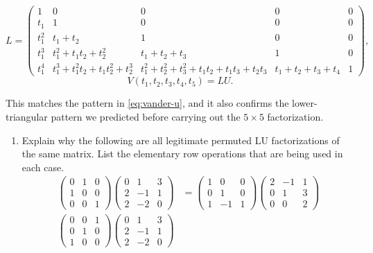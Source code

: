 \documentclass[10pt]{extarticle}
\begin{document}
\[
L=
\begin{pmatrix}
1 & 0 & 0 & 0 & 0\\
t_1 & 1 & 0 & 0 & 0\\
t_1^2 & t_1+t_2 & 1 & 0 & 0\\
t_1^3 & t_1^2+t_1t_2+t_2^2 & t_1+t_2+t_3 & 1 & 0\\
t_1^4 & t_1^3+t_1^2t_2+t_1t_2^2+t_2^3 & t_1^2+t_2^2+t_3^2+t_1t_2+t_1t_3+t_2t_3 & t_1+t_2+t_3+t_4 & 1
\end{pmatrix},
\]
\[
V(t_1,t_2,t_3,t_4,t_5)=LU.
\]
\endgroup

This matches the pattern in \eqref{eq:vander-u}, and it also confirms the lower-triangular pattern we predicted before carrying out the $5\times5$ factorization.

\newpage

\begin{problem}[Problem 3]
\begin{enumerate}[label=(\alph*)]
\item Explain why the following are all legitimate permuted LU factorizations of the same matrix. List the elementary row operations that are being used in each case.
\begin{align*}
\begin{pmatrix}
0 & 1 & 0\\
1 & 0 & 0\\
0 & 0 & 1
\end{pmatrix}
\begin{pmatrix}
0 & 1 & 3\\
2 & -1 & 1\\
2 & -2 & 0
\end{pmatrix}
&=
\begin{pmatrix}
1 & 0 & 0\\
0 & 1 & 0\\
1 & -1 & 1
\end{pmatrix}
\begin{pmatrix}
2 & -1 & 1\\
0 & 1 & 3\\
0 & 0 & 2
\end{pmatrix}\\
\begin{pmatrix}
0 & 0 & 1\\
0 & 1 & 0\\
1 & 0 & 0
\end{pmatrix}
\begin{pmatrix}
0 & 1 & 3\\
2 & -1 & 1\\
2 & -2 & 0
\end{pmatrix}

\end{align*}
\end{enumerate}
\end{problem}
\end{document}
